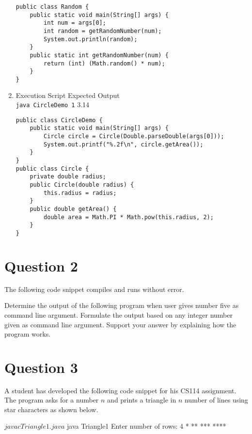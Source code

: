 \documentclass[12pt,letterpaper,twoside]{article}
\begin{document}
\begin{enumerate}[label=\textbf{(\alph*)}]
\begin{lstlisting}
public class Random {
	public static void main(String[] args) {
		int num = args[0];
		int random = getRandomNumber(num);
		System.out.println(random);
	}
	public static int getRandomNumber(num) {
		return (int) (Math.random() * num);
	}
}
\end{lstlisting}

\newpage

\item Execution Script \hfill Expected Output\\
\texttt{java CircleDemo 1} \hfill 3.14

\begin{lstlisting}
public class CircleDemo {
	public static void main(String[] args) {
		Circle circle = Circle(Double.parseDouble(args[0]));
		System.out.printf("%.2f\n", circle.getArea());
	}
}
public class Circle {
	private double radius;
	public Circle(double radius) {
		this.radius = radius;
	}
	public double getArea() {
		double area = Math.PI * Math.pow(this.radius, 2);
	}
}
\end{lstlisting}

\end{enumerate}

\section*{Question 2}

The following code snippet compiles and runs without error.

Determine the output of the following program when user gives number five as command line argument.
Formulate the output based on any integer number given as command line argument.
Support your answer by explaining how the program works.



\section*{Question 3}

A student has developed the following code snippet for his CS114 assignment.
The program asks for a number $n$ and prints a triangle in $n$ number of lines
using star characters as shown below.



\begin{terminal}
$ javac Triangle1.java
$ java Triangle1
Enter number of rows: 4
*
**
***
****
\end{terminal}
\end{document}
